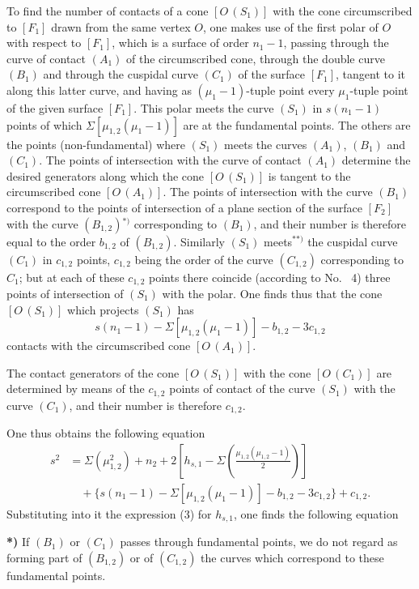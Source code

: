 \documentclass{article}
\begin{document}
To find the number of contacts of a cone $[O\,(S_1)]$ with the cone circumscribed to $[F_1]$ drawn from the same vertex $O$, one makes use of the first polar of $O$ with respect to $[F_1]$, which is a surface of order $n_1 - 1$, passing through the curve of contact $(A_1)$ of the circumscribed cone, through the double curve $(B_1)$ and through the cuspidal curve $(C_1)$ of the surface $[F_1]$, tangent to it along this latter curve, and having as $(\mu_1 - 1)$-tuple point every $\mu_1$-tuple point of the given surface $[F_1]$. This polar meets the curve $(S_1)$ in $s(n_1 - 1)$ points of which $\Sigma[\mu_{1, 2}(\mu_1 - 1)]$ are at the fundamental points. The others are the points (non-fundamental) where $(S_1)$ meets the curves $(A_1)$, $(B_1)$ and $(C_1)$. The points of intersection with the curve of contact $(A_1)$ determine the desired generators along which the cone $[O\,(S_1)]$ is tangent to the circumscribed cone $[O\,(A_1)]$. The points of intersection with the curve $(B_1)$ correspond to the points of intersection of a plane section of the surface $[F_2]$ with the curve $(B_{1, 2})$${}^{*)}$ corresponding to $(B_1)$, and their number is therefore equal to the order $b_{1, 2}$ of $(B_{1, 2})$. Similarly $(S_1)$ meets${}^{**)}$ the cuspidal curve $(C_1)$ in $c_{1, 2}$ points, $c_{1, 2}$ being the order of the curve $(C_{1, 2})$ corresponding to $C_1$; but at each of these $c_{1, 2}$ points there coincide (according to No.~ 4) three points of intersection of $(S_1)$ with the polar. One finds thus that the cone $[O\,(S_1)]$ which projects $(S_1)$ has
\[
s(n_1 - 1) - \Sigma [\mu_{1, 2}(\mu_1 - 1)] - b_{1, 2} - 3c_{1, 2}
\]
contacts with the circumscribed cone $[O\,(A_1)]$.

The contact generators of the cone $[O\,(S_1)]$ with the cone $[O\,(C_1)]$ are determined by means of the $c_{1, 2}$ points of contact of the curve $(S_1)$ with the curve $(C_1)$, and their number is therefore $c_{1, 2}$.

One thus obtains the following equation
\[
\begin{aligned}
s^2 &= \Sigma(\mu_{1, 2}^2) + n_2 + 2\left[ h_{s, 1} - \Sigma\left( \frac{\mu_{1, 2}(\mu_{1, 2} - 1)}{2} \right) \right] \\
&\quad + \{s(n_1 - 1) - \Sigma[\mu_{1, 2}(\mu_1 - 1)] - b_{1, 2} - 3c_{1, 2}\} + c_{1, 2}.
\end{aligned}
\]
Substituting into it the expression (3) for $h_{s, 1}$, one finds the following equation

\textbf{*)} If $(B_1)$ or $(C_1)$ passes through fundamental points, we do not regard as forming part of $(B_{1, 2})$ or of $(C_{1, 2})$ the curves which correspond to these fundamental points.
\end{document}

